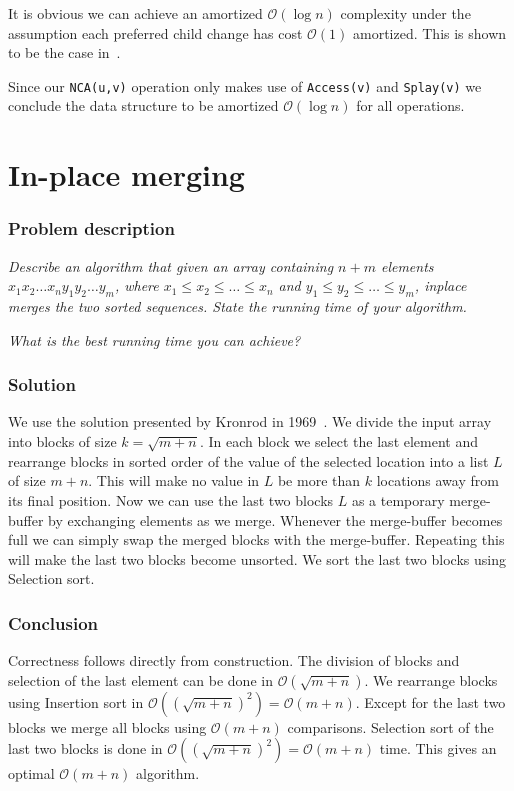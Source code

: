 \documentclass[a4paper,oneside,article,11pt]{memoir}
\begin{document}
It is obvious we can achieve an amortized $\mathcal{O}(\log n)$ complexity under the assumption each preferred child change has cost $\mathcal{O}(1)$ amortized. This is shown to be the case in~\cite{jefferickson2006}.

Since our \texttt{NCA(u,v)} operation only makes use of \texttt{Access(v)} and \texttt{Splay(v)} we conclude the data structure to be amortized $\mathcal{O}(\log n)$ for all operations.


\chapter{In-place merging}
\label{chp:inplace}
\subsection{Problem description}
\textit{Describe an algorithm that given an array containing $n+m$ elements \\ $x_1x_2\dots x_ny_1y_2\dots y_m$, where $x_1\leq x_2\leq \dots \leq x_n$ and $y_1\leq y_2\leq \dots \leq y_m$, inplace merges the two sorted sequences. State the running time of your algorithm.}

\textit{What is the best running time you can achieve?}

\subsection{Solution}
We use the solution presented by Kronrod in 1969~\cite{Kronrod}. We divide the input array into blocks of size $k = \sqrt{m+n}$. In each block we select the last element and rearrange blocks in sorted order of the value of the selected location into a list $L$ of size $m+n$. This will make no value in $L$ be more than $k$ locations away from its final position.
Now we can use the last two blocks $L$ as a temporary merge-buffer by exchanging elements as we merge. Whenever the merge-buffer becomes full we can simply swap the merged blocks with the merge-buffer. Repeating this will make the last two blocks become unsorted. We sort the last two blocks using Selection sort.

\subsection{Conclusion}
Correctness follows directly from construction. The division of blocks and selection of the last element can be done in $\mathcal{O}(\sqrt{m+n})$. We rearrange blocks using Insertion sort in $\mathcal{O}((\sqrt{m+n})^2) = \mathcal{O}(m+n)$. Except for the last two blocks we merge all blocks using $\mathcal{O}(m+n)$ comparisons. Selection sort of the last two blocks is done in $\mathcal{O}((\sqrt{m+n})^2) = \mathcal{O}(m+n)$ time. This gives an optimal $\mathcal{O}(m+n)$ algorithm.
\end{document}
